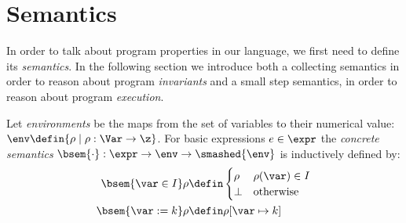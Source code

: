 \section{Semantics}

In order to talk about program properties in our language, we first
need to define its \emph{semantics}. In the following section we
introduce both a collecting semantics in order to reason about program
\emph{invariants} and a small step semantics, in order to reason about
program \emph{execution}.%

\begin{definition}
  Let \emph{environments} be the maps from the set of variables to
  their numerical value:
  \(\env \defin \{\rho \mid \rho : \Var \to \z\}\). For basic
  expressions \(e \in \expr\) the \emph{concrete semantics}
  \(\bsem{ \cdot} : \expr \to \env \to \smashed{\env}\) is
  inductively defined by:
  \begin{align*}
    \bsem{\var\in I} \rho & \defin \begin{cases} \rho & \rho(\var)\in I \\ \bot & \text{otherwise} \end{cases} \\
    \bsem{\var:= k} \rho & \defin \rho [\var\mapsto k] \\

\end{align*}
\end{definition}
